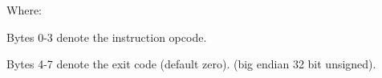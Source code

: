Where:

Bytes 0-3 denote the instruction opcode.

Bytes 4-7 denote the exit code (default zero).
(big endian 32 bit unsigned).
